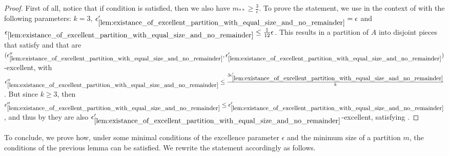 \begin{lemma}
\begin{enumerate}[label=(\roman*), ref=\roman*]
            \end{enumerate}
            \begin{proof}
                First of all, notice that if condition 
                is satisfied, then we also have $m_{**} \geq \frac{3}{\epsilon}$.
                To prove the statement, we use 
                in the context of  with the following parameters: $k = 3$,
                ${\epsilon'_{\ref{lem:existance_of_excellent_partition_with_equal_size_and_no_remainder}}} = \epsilon$
                and ${\epsilon_{\ref{lem:existance_of_excellent_partition_with_equal_size_and_no_remainder}}} \leq \frac{1}{12} \epsilon$.
                This results in a partition of $A$ into disjoint pieces that satisfy
                 and that are
                $( {\epsilon''_{\ref{lem:existance_of_excellent_partition_with_equal_size_and_no_remainder}}},
                    \epsilon'_{\ref{lem:existance_of_excellent_partition_with_equal_size_and_no_remainder}} )$-excellent,
                with ${\epsilon''_{\ref{lem:existance_of_excellent_partition_with_equal_size_and_no_remainder}}} \leq
                    \frac{3 \epsilon'_{\ref{lem:existance_of_excellent_partition_with_equal_size_and_no_remainder}}}{k}$.
                But since $k \geq 3$, then ${\epsilon''_{\ref{lem:existance_of_excellent_partition_with_equal_size_and_no_remainder}}} \leq
                    \epsilon'_{\ref{lem:existance_of_excellent_partition_with_equal_size_and_no_remainder}}$, and thus
                by  they are also
                $\epsilon'_{\ref{lem:existance_of_excellent_partition_with_equal_size_and_no_remainder}}$-excellent, satisfying
                .
            \end{proof}
        \end{lemma}

        To conclude, we prove how, under some minimal conditions
        of the excellence parameter $\epsilon$ and the minimum size of a partition $m$,
        the conditions of the previous lemma can be satisfied.
        We rewrite the statement accordingly as follows.


